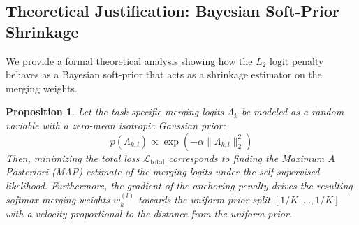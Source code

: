 \documentclass{article}
\theoremstyle{plain}
\newtheorem{proposition}[theorem]{Proposition}
\theoremstyle{definition}
\theoremstyle{remark}
\begin{document}
\subsection{Theoretical Justification: Bayesian Soft-Prior Shrinkage}
\label{sec:theory}
We provide a formal theoretical analysis showing how the $L_2$ logit penalty behaves as a Bayesian soft-prior that acts as a shrinkage estimator on the merging weights.
\begin{proposition}
Let the task-specific merging logits $\Lambda_k$ be modeled as a random variable with a zero-mean isotropic Gaussian prior:
\begin{equation}
p(\Lambda_{k, l}) \propto \exp\left(-\alpha \|\Lambda_{k, l}\|_2^2\right)
\end{equation}
Then, minimizing the total loss $\mathcal{L}_{\text{total}}$ corresponds to finding the Maximum A Posteriori (MAP) estimate of the merging logits under the self-supervised likelihood. Furthermore, the gradient of the anchoring penalty drives the resulting softmax merging weights $w_{k}^{(l)}$ towards the uniform prior split $[1/K, \dots, 1/K]$ with a velocity proportional to the distance from the uniform prior.
\end{proposition}
\end{document}
